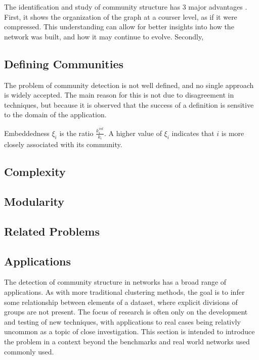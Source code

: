 The identification and study of community structure has 3 major advantages \cite{Lancichinetti2010}. First, it shows the organization of the graph at a courser level, as if it were compressed. This understanding can allow for better insights into how the network was built, and how it may continue to evolve. Secondly, 

\subsection{Defining Communities}

The problem of community detection is not well defined, and no single approach is widely accepted. The main reason for this is not due to disagreement in techniques, but because it is observed that the success of a definition is sensitive to the domain of the application. 

Embeddedness $\xi_i$ is the ratio $\frac{k^{int}_i}{k_i}$. A higher value of $\xi_i$ indicates that $i$ is more closely associated with its community.   


\subsection{Complexity}

\subsection{Modularity}

\subsection{Related Problems}




\subsection{Applications}
The detection of community structure in networks has a broad range of applications. As with more traditional clustering methods, the goal is to infer some relationship between elements of a dataset, where explicit divisions of groups are not present. The focus of research is often only on the development and testing of new techniques, with applications to real cases being relativly uncommon as a topic of close investigation. This section is intended to introduce the problem in a context beyond the benchmarks and real world networks used commonly used.

